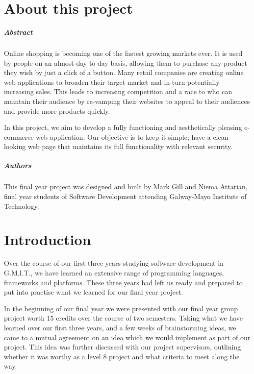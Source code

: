 
\listoffigures

\chapter*{About this project}
\paragraph{Abstract}
Online shopping is becoming one of the fastest growing markets ever. It is used by people on an almost day-to-day basis, allowing them to purchase any product they wish by just a click of a button. Many retail companies are creating online web applications to broaden their target market and in-turn potentially increasing sales. This leads to increasing competition and a race to who can maintain their audience by re-vamping their websites to appeal to their audiences and provide more products quickly.

In this project, we aim to develop a fully functioning and aesthetically pleasing e-commerce web application. Our objective is to keep it simple; have a clean looking web page that maintains its full functionality with relevant security.

\paragraph{Authors}
This final year project was designed and built by Mark Gill and Niema Attarian, final year students of Software Development attending Galway-Mayo Institute of Technology.

\chapter{Introduction}
Over the course of our first three years studying software development in G.M.I.T., we have learned an extensive range of programming languages, frameworks and platforms. These three years had left us ready and prepared to put into practise what we learned for our final year project.

In the beginning of our final year we were presented with our final year group project worth 15 credits over the course of two semesters. Taking what we have learned over our first three years, and a few weeks of brainstorming ideas, we came to a mutual agreement on an idea which we would implement as part of our project. This idea was further discussed with our project supervisors, outlining whether it was worthy as a level 8 project and what criteria to meet along the way.

